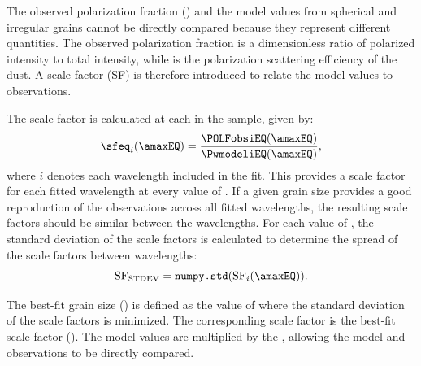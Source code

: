 
The observed polarization fraction (\POLFobsNS) and the \Pw model values from spherical and irregular grains cannot be directly compared because they represent different quantities. The observed polarization fraction is a dimensionless ratio of polarized intensity to total intensity, while \Pw is the polarization scattering efficiency of the dust. A scale factor (SF) is therefore introduced to relate the model values to observations. 


The scale factor is calculated at each \amax in the sample, given by:
\begin{equation}
\sfeq_i(\amaxEQ) = \frac{\POLFobsiEQ(\amaxEQ)}{\PwmodeliEQ(\amaxEQ)},
    \label{eq: sf}
\end{equation}
\noindent where $i$ denotes each wavelength included in the fit. This provides a scale factor for each fitted wavelength at every value of \amaxNS. If a given grain size provides a good reproduction of the observations across all fitted wavelengths, the resulting scale factors should be similar between the wavelengths. For each value of \amaxNS, the standard deviation of the scale factors is calculated to determine the spread of the scale factors between wavelengths:
\begin{equation}
    \text{SF}_{\text{STDEV}} = \texttt{numpy.std}(\text{SF}_i(\amaxEQ)).
    \label{eq: sf_std}
\end{equation}

The best-fit grain size (\amaxbestNS) is defined as the value of \amax where the standard deviation of the scale factors is minimized. The corresponding scale factor is the best-fit scale factor (\sfbestNS). The model \Pw values are multiplied by the \sfbestNS, allowing the model and observations to be directly compared.
 
